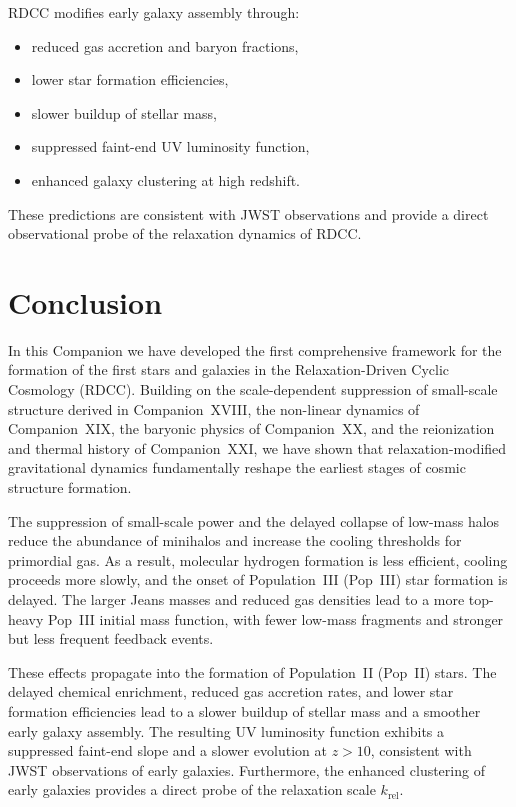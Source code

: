 \documentclass[11pt,a4paper]{article}
\begin{document}
RDCC modifies early galaxy assembly through:

\begin{itemize}
    \item reduced gas accretion and baryon fractions,
    \item lower star formation efficiencies,
    \item slower buildup of stellar mass,
    \item suppressed faint-end UV luminosity function,
    \item enhanced galaxy clustering at high redshift.
\end{itemize}

These predictions are consistent with JWST observations and provide a direct observational 
probe of the relaxation dynamics of RDCC.

\section{Conclusion}

In this Companion we have developed the first comprehensive framework for the formation of the 
first stars and galaxies in the Relaxation-Driven Cyclic Cosmology (RDCC). Building on the 
scale-dependent suppression of small-scale structure derived in Companion~XVIII, the 
non-linear dynamics of Companion~XIX, the baryonic physics of Companion~XX, and the 
reionization and thermal history of Companion~XXI, we have shown that relaxation-modified 
gravitational dynamics fundamentally reshape the earliest stages of cosmic structure 
formation.

The suppression of small-scale power and the delayed collapse of low-mass halos reduce the 
abundance of minihalos and increase the cooling thresholds for primordial gas. As a result, 
molecular hydrogen formation is less efficient, cooling proceeds more slowly, and the onset of 
Population~III (Pop~III) star formation is delayed. The larger Jeans masses and reduced gas 
densities lead to a more top-heavy Pop~III initial mass function, with fewer low-mass 
fragments and stronger but less frequent feedback events.

These effects propagate into the formation of Population~II (Pop~II) stars. The delayed 
chemical enrichment, reduced gas accretion rates, and lower star formation efficiencies lead 
to a slower buildup of stellar mass and a smoother early galaxy assembly. The resulting UV 
luminosity function exhibits a suppressed faint-end slope and a slower evolution at 
$z > 10$, consistent with JWST observations of early galaxies. Furthermore, the enhanced 
clustering of early galaxies provides a direct probe of the relaxation scale $k_{\mathrm{rel}}$.
\end{document}
